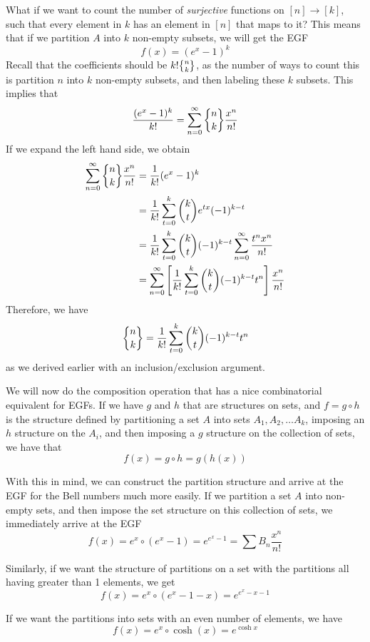 \documentclass[11pt,twosided]{article}
\begin{document}
What if we want to count the number of \textit{surjective} functions on $[n]\rightarrow [k]$, such that every element in $k$ has an element in $[n]$ that maps to it? This means that if we partition $A$ into $k$ non-empty subsets, we will get the EGF
\[
	f(x) = (e^x - 1)^k 
\]
Recall that the coefficients should be $k! \stirii{n}{k}$, as the number of ways to count this is partition $n$ into $k$ non-empty subsets, and then labeling these $k$ subsets. This implies that 
\[
	\frac{(e^x - 1)^k}{k!} = \sum_{n=0}^\infty \dstirii{n}{k} \frac{x^n}{n!}
\]
If we expand the left hand side, we obtain
\begin{align*}
\sum_{n=0}^\infty \dstirii{n}{k} \frac{x^n}{n!} &= \frac{1}{k!} (e^x - 1)^k \\
&= \frac{1}{k!} \sum_{t=0}^k \binom{k}{t} e^{tx} (-1)^{k-t} \\
&= \frac{1}{k!} \sum_{t=0}^k \binom{k}{t} (-1)^{k-t} \sum_{n=0}^\infty \frac{t^n x^n}{n!} \\
&= \sum_{n=0}^\infty\left[ \frac{1}{k!} \sum_{t=0}^k \binom{k}{t} (-1)^{k-t} t^n \right] \frac{x^n}{n!} \\
\end{align*}
Therefore, we have 
\[
	\dstirii{n}{k} = \frac{1}{k!} \sum_{t=0}^k \binom{k}{t} (-1)^{k-t} t^n 
\]
as we derived earlier with an inclusion/exclusion argument. 

We will now do the composition operation that has a nice combinatorial equivalent for EGFs. If we have $g$ and $h$ that are structures on sets, and $f = g \circ h$ is the structure defined by partitioning a set $A$ into sets $A_1, A_2, \ldots A_k$, imposing an $h$ structure on the $A_i$, and then imposing a $g$ structure on the collection of sets, we have that 
\[
	f(x) = g \circ h = g(h(x))
\]

With this in mind, we can construct the partition structure and arrive at the EGF for the Bell numbers much more easily. If we partition a set $A$ into non-empty sets, and then impose the set structure on this collection of sets, we immediately arrive at the EGF 
\[
	f(x) = e^x \circ (e^x - 1) = e^{e^x - 1} = \sum B_n \frac{x^n}{n!}
\]

Similarly, if we want the structure of partitions on a set with the partitions all having greater than 1 elements, we get 
\[
	f(x) = e^x \circ (e^x - 1 - x) = e^{e^x - x - 1} 
\]

If we want the partitions into sets with an even number of elements, we have 
\[
	f(x) = e^x \circ \cosh(x) = e^{\cosh x}
\]
\end{document}
